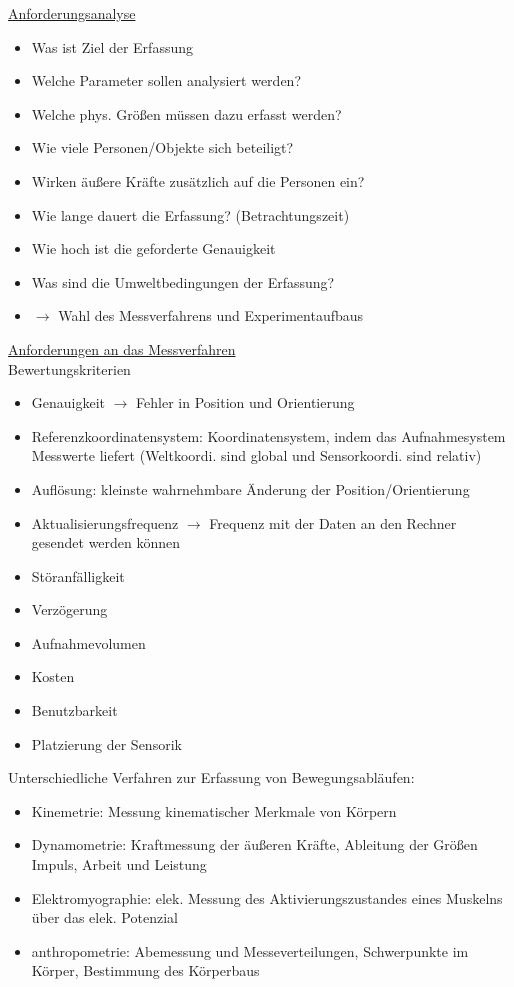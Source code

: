 \documentclass[a4paper,10pt,oneside]{article}
\begin{document}
\underline{Anforderungsanalyse} \\
	\begin{itemize}
		\item Was ist Ziel der Erfassung
		\item Welche Parameter sollen analysiert werden?
		\item Welche phys. Größen müssen dazu erfasst werden?
		\item Wie viele Personen/Objekte sich beteiligt?
		\item Wirken äußere Kräfte zusätzlich auf die Personen ein?
		\item Wie lange dauert die Erfassung? (Betrachtungszeit)
		\item Wie hoch ist die geforderte Genauigkeit
		\item Was sind die Umweltbedingungen der Erfassung?
		\item $\rightarrow$ Wahl des Messverfahrens und Experimentaufbaus
	\end{itemize}


\underline{Anforderungen an das Messverfahren} \\
Bewertungskriterien
	\begin{itemize}
		\item Genauigkeit $\rightarrow$ Fehler in Position und Orientierung
		\item Referenzkoordinatensystem: Koordinatensystem, indem das Aufnahmesystem Messwerte liefert (Weltkoordi. sind global und Sensorkoordi. sind relativ)
		\item Auflösung: kleinste wahrnehmbare Änderung der Position/Orientierung
		\item Aktualisierungsfrequenz $\rightarrow$ Frequenz mit der Daten an den Rechner gesendet werden können
		\item Störanfälligkeit	
		\item Verzögerung
		\item Aufnahmevolumen
		\item Kosten
		\item Benutzbarkeit
		\item Platzierung der Sensorik
	\end{itemize}

Unterschiedliche Verfahren zur Erfassung von Bewegungsabläufen:
	\begin{itemize}
		\item Kinemetrie: Messung kinematischer Merkmale von Körpern
		\item Dynamometrie: Kraftmessung der äußeren Kräfte, Ableitung der Größen Impuls, Arbeit und Leistung
		\item Elektromyographie: elek. Messung des Aktivierungszustandes eines Muskelns über das elek. Potenzial
		\item anthropometrie: Abemessung und Messeverteilungen, Schwerpunkte im Körper, Bestimmung des Körperbaus
	\end{itemize}
\end{document}
